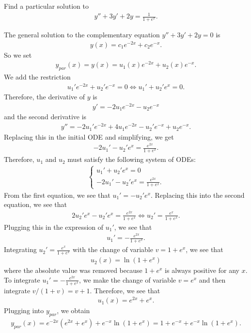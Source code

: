 \documentclass[12pt,a4paper]{article}
\newcounter{example}[section]
\begin{document}
\begin{example}
Find a particular solution to 
	\begin{align*}
	y'' + 3y' + 2y = \frac{1}{1 + e^x} .
	\end{align*}
\end{example}
\begin{notes}
The general solution to the complementary equation $y'' + 3y' + 2y = 0$ is
	\begin{align*}
	y (x) = c_1 e^{-2 x} + c_2 e^{-x} .
	\end{align*}
So we set
	\begin{align*}
	y_{par} (x) = y(x) = u_1 (x) e^{-2x} + u_2 (x) e^{-x} .
	\end{align*}
We add the restriction 
	\begin{align*}
	u_1' e^{-2x} + u_2' e^{-x} = 0 \iff u_1' + u_2' e^{x} = 0.
	\end{align*}
Therefore, the derivative of $y$ is
	\begin{align*}
	y' = -2 u_1 e^{-2x} - u_2 e^{-x} 
	\end{align*}
and the second derivative is
	\begin{align*}
	y'' = -2u_1' e^{-2x} + 4 u_1 e^{-2x} - u_2' e^{-x} + u_2 e^{-x} .
	\end{align*}
Replacing this in the initial ODE and simplifying, we get
	\begin{align*}
	-2u_1' - u_2' e^x = \frac{e^{2x}}{1 + e^x} .
	\end{align*}
Therefore, $u_1$ and $u_2$ must satisfy the following system of ODEs:
	\begin{align*}
	\left\{ \begin{matrix}
	u_1' + u_2' e^{x} = 0 \\
	-2u_1' - u_2' e^x = \frac{e^{2x}}{1 + e^x} .
	\end{matrix} \right.
	\end{align*}
From the first equation, we see that $u_1' = -u_2' e^x$. Replacing this into the second equation, we see that
	\begin{align*}
	2u_2' e^x - u_2' e^x = \frac{e^{2x}}{1 + e^x} \iff u_2' = \frac{e^x}{1 + e^x} .
	\end{align*}
	Plugging this in the expression of $u_1'$, we see that 
		\begin{align*}
		u_1' = -\frac{e^{2x}}{1 + e^x} .
		\end{align*}
	Integrating $u_2' = \frac{e^x}{1 + e^x}$ with the change of variable $v = 1 + e^x$, we see that
		\begin{align*}
		u_2 (x) = \ln (1 + e^x )
		\end{align*}
	where the absolute value was removed because $1 + e^x$ is always positive for any $x$. To integrate $u_1' = -\frac{e^{2x}}{1 + e^x}$, we make the change of variable $v = e^x$ and then integrate $v/(1 + v) = v + 1$. Therefore, we see that
		\begin{align*}
		u_1 (x) = e^{2x} + e^x .
		\end{align*}
	Plugging into $y_{par}$, we obtain
		\begin{align*}
		y_{par} (x) = e^{-2x} (e^{2x} + e^x) + e^{-x} \ln (1 + e^x) = 1 + e^{-x} + e^{-x} \ln (1 + e^x ) .
		\end{align*}
		

\end{notes}
\end{document}
